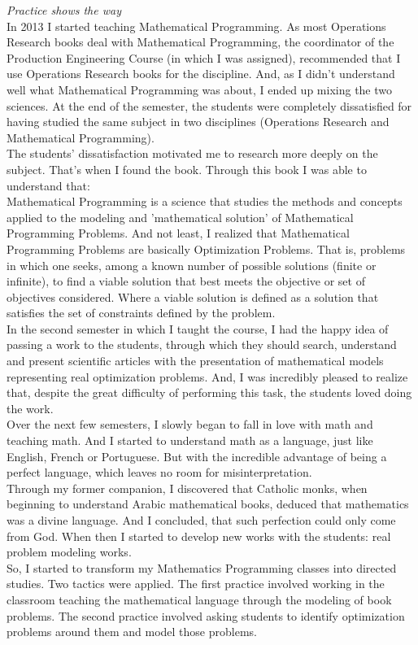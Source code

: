 \documentclass{book}
\begin{document}
\emph{Practice shows the way} \\

In 2013 I started teaching Mathematical Programming. As most Operations Research books deal with Mathematical Programming, the coordinator of the Production Engineering Course (in which I was assigned), recommended that I use Operations Research books for the discipline. And, as I didn't understand well what Mathematical Programming was about, I ended up mixing the two sciences. At the end of the semester, the students were completely dissatisfied for having studied the same subject in two disciplines (Operations Research and Mathematical Programming). \\

The students' dissatisfaction motivated me to research more deeply on the subject. That's when I found the book. Through this book I was able to understand that: \\

Mathematical Programming is a science that studies the methods and concepts applied to the modeling and 'mathematical solution' of Mathematical Programming Problems. And not least, I realized that Mathematical Programming Problems are basically Optimization Problems. That is, problems in which one seeks, among a known number of possible solutions (finite or infinite), to find a viable solution that best meets the objective or set of objectives considered. Where a viable solution is defined as a solution that satisfies the set of constraints defined by the problem. \\

In the second semester in which I taught the course, I had the happy idea of passing a work to the students, through which they should search, understand and present scientific articles with the presentation of mathematical models representing real optimization problems. And, I was incredibly pleased to realize that, despite the great difficulty of performing this task, the students loved doing the work. \\

Over the next few semesters, I slowly began to fall in love with math and teaching math. And I started to understand math as a language, just like English, French or Portuguese. But with the incredible advantage of being a perfect language, which leaves no room for misinterpretation. \\

Through my former companion, I discovered that Catholic monks, when beginning to understand Arabic mathematical books, deduced that mathematics was a divine language. And I concluded, that such perfection could only come from God. When then I started to develop new works with the students: real problem modeling works. \\

So, I started to transform my Mathematics Programming classes into directed studies. Two tactics were applied. The first practice involved working in the classroom teaching the mathematical language through the modeling of book problems. The second practice involved asking students to identify optimization problems around them and model those problems. \\
\end{document}
